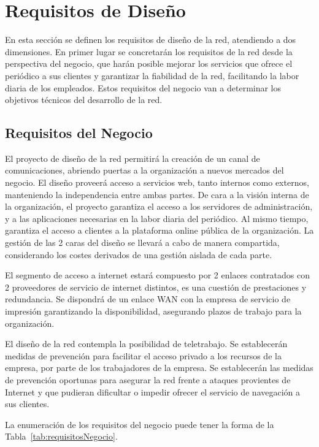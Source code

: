 \documentclass[a4paper,onecolumn,11pt]{article}
\begin{document}
\section{Requisitos de Diseño}

En esta sección se definen los requisitos de diseño de la red, atendiendo a dos dimensiones. En primer lugar se concretarán los requisitos de 
la red desde la perspectiva del negocio, que harán posible mejorar los servicios que ofrece el periódico a sus clientes y garantizar la 
fiabilidad de la red, facilitando la labor diaria de los empleados. Estos requisitos del negocio van a determinar los objetivos técnicos del 
desarrollo de la red.

\subsection{Requisitos del Negocio}
El proyecto de diseño de la red permitirá la creación de un canal de comunicaciones, 
abriendo puertas a la organización a nuevos mercados del negocio.
El diseño proveerá acceso a servicios web, tanto internos como externos, manteniendo la independencia entre ambas partes.
De cara a la visión interna de la organización, el proyecto garantiza el acceso a los servidores de administración, y a las aplicaciones 
necesarias en la labor diaria del periódico. Al mismo tiempo, garantiza el acceso a clientes a la plataforma online pública de la organización. 
La gestión de las 2 caras del diseño se llevará a cabo de manera compartida, considerando los costes derivados de una gestión aislada de cada 
parte.

El segmento de acceso a internet estará compuesto por 2 enlaces contratados con 2 proveedores de servicio de internet  distintos, es una 
cuestión de prestaciones y redundancia. Se dispondrá de un enlace WAN con la empresa de servicio de impresión garantizando la 
disponibilidad, asegurando plazos de trabajo para la organización.

El diseño de la red contempla la posibilidad de teletrabajo. Se establecerán medidas de prevención para facilitar el acceso privado a los 
recursos de la empresa, por parte de los trabajadores de la empresa.
Se establecerán las medidas de prevención oportunas para asegurar la red frente a ataques provientes de Internet y que pudieran
dificultar o impedir ofrecer el servicio de navegación a sus clientes.

La enumeración de los requisitos del negocio puede tener la forma de la Tabla~\ref{tab:requisitosNegocio}.
\end{document}
